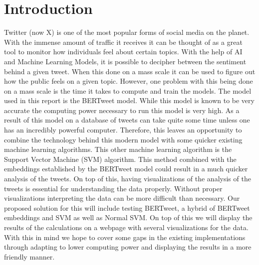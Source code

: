 \documentclass[conference]{IEEEtran}
\begin{document}
\section{Introduction}
Twitter (now X) is one of the most popular forms of social media on the planet.
With the immense amount of traffic it receives it can be thought of as a great tool to monitor how individuals feel about certain topics.
With the help of AI and Machine Learning Models, it is possible to decipher between the sentiment behind a given tweet.
When this done on a mass scale it can be used to figure out how the public feels on a given topic.
However, one problem with this being done on a mass scale is the time it takes to compute and train the models.
The model used in this report is the BERTweet model.
While this model is known to be very accurate the computing power necessary to run this model is very high.
As a result of this model on a database of tweets can take quite some time unless one has an incredibly powerful computer.
Therefore, this leaves an opportunity to combine the technology behind this modern model with some quicker existing machine learning algorithms.
This other machine learning algorithm is the Support Vector Machine (SVM) algorithm.
This method combined with the embeddings established by the BERTweet model could result in a much quicker analysis of the tweets.
On top of this, having visualizations of the analysis of the tweets is essential for understanding the data properly.
Without proper visualizations interpreting the data can be more difficult than necessary. 
Our proposed solution for this will include testing BERTweet, a hybrid of BERTweet embeddings and SVM as well as Normal SVM. 
On top of this we will display the results of the calculations on a webpage with several visualizations for the data. 
With this in mind we hope to cover some gaps in the existing implementations through adapting to lower computing power and displaying the results in a more friendly manner. 
\end{document}
